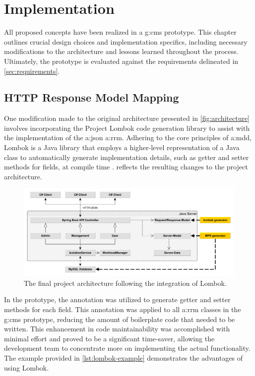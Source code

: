 \chapter{Implementation}\label{ch:impl}

All proposed concepts have been realized in a \gls{g:cms} prototype. This chapter outlines crucial design choices and implementation specifics, including necessary modifications to the architecture and lessons learned throughout the process. Ultimately, the prototype is evaluated against the requirements delineated in \cref{sec:requirements}.

\section{HTTP Response Model Mapping}\label{sec:impl-lombok}

One modification made to the original architecture presented in \vref{fig:architecture} involves incorporating the Project Lombok code generation library to assist with the implementation of the \gls{a:json} \gls{a:rrm}. Adhering to the core principles of \gls{a:mdd}, Lombok is a Java library that employs a higher-level representation of a Java class to automatically generate implementation details, such as getter and setter methods for fields, at compile time \cite{lombok}.  reflects the resulting changes to the project architecture.

\begin{figure}[H]
\centering
\includegraphics[width=\textwidth]{images/big-picture}
\caption{The final project architecture following the integration of Lombok.}
\label{fig:architecture-with-lombok}
\end{figure}

In the prototype, the  annotation was utilized to generate getter and setter methods for each field. This annotation was applied to all \gls{a:rrm} classes in the \gls{g:cms} prototype, reducing the amount of boilerplate code that needed to be written. This enhancement in code maintainability was accomplished with minimal effort and proved to be a significant time-saver, allowing the development team to concentrate more on implementing the actual functionality. The example provided in \vref{lst:lombok-example} demonstrates the advantages of using Lombok.

